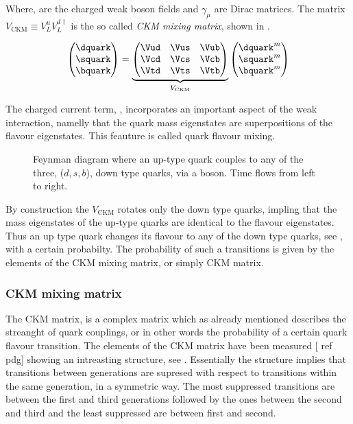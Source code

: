 \noindent Where, \Wpm are the charged weak boson fields and $\gamma_\mu$ are Dirac matrices.
The matrix $V_{\text{CKM}} \equiv V^u_LV^{d\dagger}_L$ is the so called {\it CKM mixing matrix}, shown in .

\begin{equation}
  \begin{pmatrix} \dquark \\ \squark \\ \bquark  \end{pmatrix} =
  \underbrace{\begin{pmatrix} \Vud & \Vus & \Vub \\ \Vcd & \Vcs & \Vcb \\ \Vtd & \Vts & \Vtb \end{pmatrix}}_{V_{\text{CKM}}}
    \begin{pmatrix} \dquark^m \\ \squark^m \\ \bquark^m  \end{pmatrix}
  \label{quark_field_rotation}
  \end{equation}

The charged current term, , incorporates an important aspect of the weak interaction,
namelly that the quark mass eigenstates are superpositions of the flavour eigenstates. This feauture is called
quark flavour mixing.

\begin{figure}[h]
  \centering
  {\sffamily }
  \caption{Feynman diagram where an up-type quark couples to any of the three, ($d,s,b$), down type quarks,
           via a \Wp boson. Time flows from left to right.}
  \label{QuarkMixing}
\end{figure}

\noindent By construction the $V_{\text{CKM}}$ rotates only the down type quarks, impling that
the mass eigenstates of the up-type quarks are identical to the flavour eigenstates. Thus an up type quark
changes its flavour to any of the down type quarks, see , with a certain probabilty.
The probability of such a transitions is given by the elements of the CKM mixing matrix, or simply CKM matrix.

\subsubsection{CKM mixing matrix}
The CKM matrix, is a complex matrix which as already mentioned describes the streanght of quark couplings,
or in other words the probability of a certain quark flavour transition. The elements of the CKM matrix have been measured [{\color{red} ref pdg}]
showing an intreasting structure, see . Essentially the structure implies that transitions between generations
are supresed with respect to transitions within the same generation, in a symmetric way. The most suppressed transitions are between
the first and third generations followed by the ones between the second and third and the least suppressed are between first and second.

